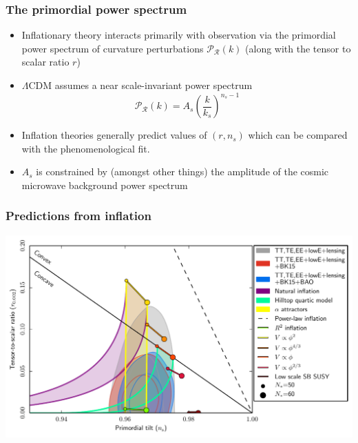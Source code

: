 \documentclass[%
]{beamer}
\begin{document}
\begin{frame}
    \frametitle{The primordial power spectrum}
    \begin{itemize}
        \item Inflationary theory interacts primarily with observation via the primordial power spectrum of curvature perturbations $\mathcal{P}_\mathcal{R}(k)$ (along with the tensor to scalar ratio $r$)
        \item $\Lambda$CDM assumes a near scale-invariant power spectrum 
            \[ \mathcal{P}_\mathcal{R}(k) = A_s {\left( \frac{k}{k_s} \right)}^{n_s-1} \]
        \item Inflation theories generally predict values of $(r,n_s)$ which can be compared with the phenomenological fit.
        \item $A_s$ is constrained by (amongst other things) the amplitude of the cosmic microwave background power spectrum
    \end{itemize}
\end{frame}
\begin{frame}
    \frametitle{Predictions from inflation}
    \includegraphics[width=\textwidth]{figures/inflation.pdf}
\end{frame}
\end{document}
